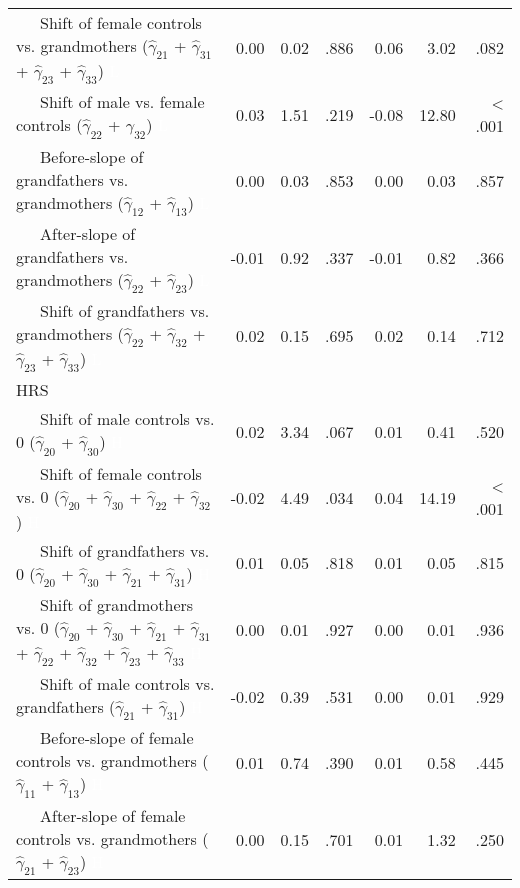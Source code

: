 \documentclass[
  english,
  man, noextraspace]{apa7}
\newenvironment{lltable}{\begin{landscape}\begin{center}\begin{ThreePartTable}}{\end{ThreePartTable}\end{center}\end{landscape}}
\begin{document}
\begin{appendix}
\begin{lltable}
{\begin{longtable}{lrrrrrr}
\ \ \ Shift of female controls vs. grandmothers 
($\hat{\gamma}_{21}$ + $\hat{\gamma}_{31}$ + 
$\hat{\gamma}_{23}$ + $\hat{\gamma}_{33}$) \textcolor{white}{L} & 0.00 & 0.02 & .886 & 0.06 & 3.02 & .082\\
\ \ \ Shift of male vs. female controls 
($\hat{\gamma}_{22}$ + $\hat{\gamma}_{32}$) \textcolor{white}{L} & 0.03 & 1.51 & .219 & -0.08 & 12.80 & < .001\\
\ \ \ Before-slope of grandfathers vs. grandmothers 
($\hat{\gamma}_{12}$ + $\hat{\gamma}_{13}$) \textcolor{white}{L} & 0.00 & 0.03 & .853 & 0.00 & 0.03 & .857\\
\ \ \ After-slope of grandfathers vs. grandmothers 
($\hat{\gamma}_{22}$ + $\hat{\gamma}_{23}$) \textcolor{white}{L} & -0.01 & 0.92 & .337 & -0.01 & 0.82 & .366\\
\ \ \ Shift of grandfathers vs. grandmothers 
($\hat{\gamma}_{22}$ + $\hat{\gamma}_{32}$ + 
$\hat{\gamma}_{23}$ + $\hat{\gamma}_{33}$) \textcolor{white}{L} & 0.02 & 0.15 & .695 & 0.02 & 0.14 & .712\\
HRS &  &  &  &  &  & \\
\ \ \ Shift of male controls vs. 0 ($\hat{\gamma}_{20}$ + 
$\hat{\gamma}_{30}$) \textcolor{white}{H} & 0.02 & 3.34 & .067 & 0.01 & 0.41 & .520\\
\ \ \ Shift of female controls vs. 0 ($\hat{\gamma}_{20}$ + 
$\hat{\gamma}_{30}$ + $\hat{\gamma}_{22}$ + 
$\hat{\gamma}_{32}$) \textcolor{white}{H} & -0.02 & 4.49 & .034 & 0.04 & 14.19 & < .001\\
\ \ \ Shift of grandfathers vs. 0 ($\hat{\gamma}_{20}$ + 
$\hat{\gamma}_{30}$ + $\hat{\gamma}_{21}$ + 
$\hat{\gamma}_{31}$) \textcolor{white}{H} & 0.01 & 0.05 & .818 & 0.01 & 0.05 & .815\\
\ \ \ Shift of grandmothers vs. 0 ($\hat{\gamma}_{20}$ + 
$\hat{\gamma}_{30}$ + $\hat{\gamma}_{21}$ + 
$\hat{\gamma}_{31}$ + $\hat{\gamma}_{22}$ + 
$\hat{\gamma}_{32}$ + $\hat{\gamma}_{23}$ +
$\hat{\gamma}_{33}$ \textcolor{white}{H} & 0.00 & 0.01 & .927 & 0.00 & 0.01 & .936\\
\ \ \ Shift of male controls vs. grandfathers 
($\hat{\gamma}_{21}$ + $\hat{\gamma}_{31}$) \textcolor{white}{H} & -0.02 & 0.39 & .531 & 0.00 & 0.01 & .929\\
\ \ \ Before-slope of female controls vs. grandmothers 
($\hat{\gamma}_{11}$ + $\hat{\gamma}_{13}$) \textcolor{white}{H} & 0.01 & 0.74 & .390 & 0.01 & 0.58 & .445\\
\ \ \ After-slope of female controls vs. grandmothers 
($\hat{\gamma}_{21}$ + $\hat{\gamma}_{23}$) \textcolor{white}{H} & 0.00 & 0.15 & .701 & 0.01 & 1.32 & .250\\

\end{longtable}}
\end{lltable}
\end{appendix}
\end{document}
